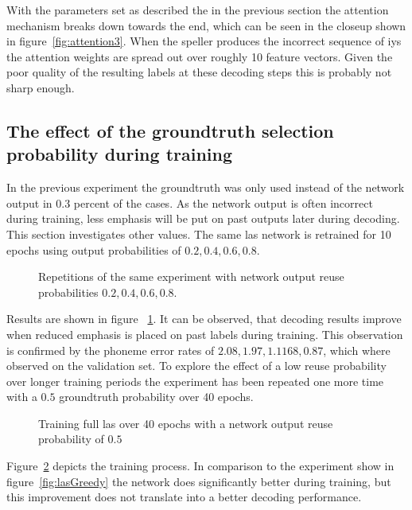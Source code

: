 With the parameters set as described the in the previous section the attention mechanism breaks down towards the end, which can be seen in the closeup shown in figure~\ref{fig:attention3}. When the speller produces the incorrect sequence of iys the attention weights are spread out over roughly 10 feature vectors. Given the poor quality of the resulting labels at these decoding steps this is probably not sharp enough.


\subsection{The effect of the groundtruth selection probability during training}
In the previous experiment the groundtruth was only used instead of the network output in 0.3 percent of the cases. As the network output is often incorrect during training, less emphasis will be put on past outputs later during decoding. This section investigates
other values. The same las network is retrained for 10 epochs using output probabilities of $0.2,0.4,0.6,0.8$.
\begin{figure}




\caption{Repetitions of the same experiment with network output reuse probabilities $0.2, 0.4, 0.6, 0.8$. }
\label{fig:lasGreedy2468}
\end{figure}
Results are shown in figure ~\ref{fig:lasGreedy2468}. It can be observed, that decoding results improve when reduced emphasis is placed on past labels during training. This observation is confirmed by the phoneme error rates of $2.08, 1.97, 1.1168, 0.87$, which where observed on the validation set.
To explore the effect of a low reuse probability over longer training periods the experiment has been repeated one more time with a $0.5$ groundtruth probability over 40 epochs.
\begin{figure}


\caption{Training full las over 40 epochs with a network output reuse probability of $0.5$}
\label{fig:lasGreedy05}
\end{figure}
Figure~\ref{fig:lasGreedy05} depicts the training process. In comparison to the experiment show in figure~\ref{fig:lasGreedy} the network does significantly better during training, but
this improvement does not translate into a better decoding performance.

